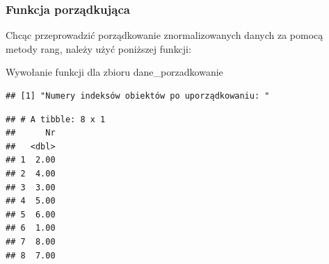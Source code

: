 \documentclass[12pt,a4paper]{report}
\begin{document}
{\subsubsection{Funkcja porządkująca}\label{funkcja-porzadkujaca-metoda-rang}
Chcąc przeprowadzić porządkowanie znormalizowanych danych za pomocą metody rang, należy użyć poniższej funkcji:
\begin{Shaded}
\begin{Highlighting}[]
  \NormalTok{\{}
  \NormalTok{:}
  \NormalTok{\{}
    \NormalTok{x[}\NormalTok{]=}
  \NormalTok{\}}
  \NormalTok{x[,}\NormalTok{] <-} 
  \NormalTok{:}
  \NormalTok{\{}
    \NormalTok{):(}\NormalTok{))}
    \NormalTok{\{}
      \NormalTok{x[i,}\NormalTok{(x)]=x[i,}\NormalTok{(x)]+x[i,j]}
    \NormalTok{\}}
    \NormalTok{x[i,}\NormalTok{(x)]=x[i,}\NormalTok{(x)]/(}\NormalTok{)}
  \NormalTok{\}}
  \NormalTok{x<-x[}\NormalTok{(x$zmienna_syntetyczna),]}
  \NormalTok{(}\NormalTok{)}
  \NormalTok{(x[}\NormalTok{])}
\NormalTok{\}}
\end{Highlighting}
\end{Shaded}
Wywołanie funkcji dla zbioru dane\_porzadkowanie 
\begin{Shaded}
\begin{Highlighting}[]
\end{Highlighting}
\end{Shaded}
\begin{verbatim}
## [1] "Numery indeksów obiektów po uporządkowaniu: "
\end{verbatim}
\begin{verbatim}
## # A tibble: 8 x 1
##      Nr
##   <dbl>
## 1  2.00
## 2  4.00
## 3  3.00
## 4  5.00
## 5  6.00
## 6  1.00
## 7  8.00
## 8  7.00
\end{verbatim}

}
\end{document}
